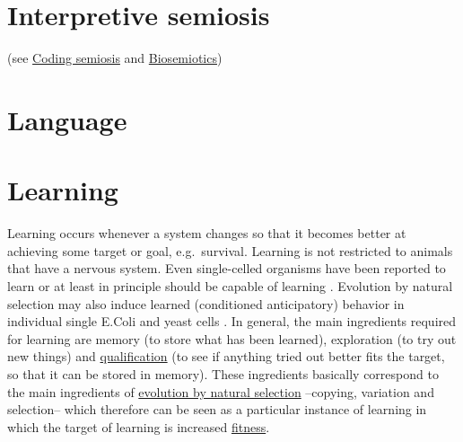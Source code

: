 \documentclass[12pt]{article}
\begin{document}
\hypertarget{interpretive_semiosis}{}
\section{Interpretive semiosis} (see \hyperlink{coding_semiosis}{Coding semiosis} and \hyperlink{biosemiotics}{Biosemiotics})

\hypertarget{language}{}
\section{Language}

\hypertarget{learning}{}
\section{Learning}
Learning occurs whenever a system changes so that it becomes better at
achieving some target or goal, e.g.~survival. Learning is not
restricted to animals that have a nervous system. Even single-celled
organisms have been reported to learn
\cite{hennesey79:_class,armus06:_discr_learn_paramecia} or at least in
principle should be capable of learning
\cite{fernando09:_molecular_associative_learning_singe_cel_organisms}. Evolution
by natural selection may also induce learned (conditioned
anticipatory) behavior in individual single E.Coli and yeast cells
\cite{tagkopoulos08:_predictive_behavior_microb,mitchell09:_adaptive_prediction_microorganism}.
In general, the main ingredients required for learning are memory (to
store what has been learned), exploration (to try out new things) and
\hyperlink{qualification}{qualification} (to see if anything tried out
better fits the target, so that it can be stored in memory). These
ingredients basically correspond to the main ingredients of
\hyperlink{natural_selection}{evolution by natural selection}
--copying, variation and selection-- which therefore can be seen as a
particular instance of learning in which the target of learning is
increased \hyperlink{fitness}{fitness}.

\hypertarget{macroevolution}{}
\end{document}
